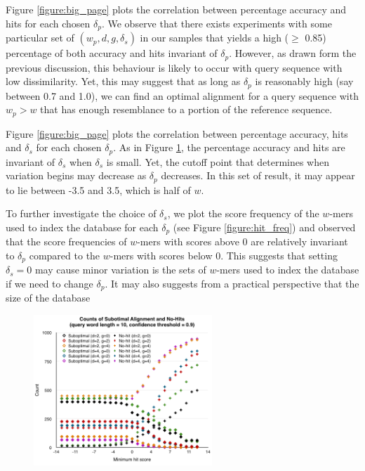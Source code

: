 \documentclass{article}
\begin{document}
Figure \ref{figure:big_page} plots the correlation between percentage accuracy and hits for each chosen $\delta_p$. We observe that there exists experiments with some particular set of $(w_p, d, g, \delta_s)$ in our samples that yields a high ($\ge$ 0.85) percentage of both accuracy and hits invariant of $\delta_p$. However, as drawn form the previous discussion, this behaviour is likely to occur with query sequence with low dissimilarity. Yet, this may suggest that as long as $\delta_p$ is reasonably high (say between 0.7 and 1.0), we can find an optimal alignment for a query sequence with $w_p > w$ that has enough resemblance to a portion of the reference sequence.

Figure \ref{figure:big_page} plots the correlation between percentage accuracy, hits and $\delta_s$ for each chosen $\delta_p$. As in Figure \ref{figure:counts_10}, the percentage accuracy and hits are invariant of $\delta_s$ when $\delta_s$ is small. Yet, the cutoff point that determines when variation begins may decrease as $\delta_p$ decreases. In this set of result, it may appear to lie between -3.5 and 3.5, which is half of $w$. 

To further investigate the choice of $\delta_s$, we plot the score frequency of the $w$-mers used to index the database for each $\delta_p$ (see Figure \ref{figure:hit_freq}) and observed that the score frequencies of $w$-mers with scores above 0 are relatively invariant to $\delta_p$ compared to the $w$-mers with scores below 0. This suggests that setting $\delta_s = 0$ may cause minor variation is the sets of $w$-mers used to index the database if we need to change $\delta_p$. It may also suggests from a practical perspective that the size of the database 

\begin{figure}[tbp]
\begin{center}
\caption{}
  \includegraphics[width=0.60\textwidth]{counts-10}
  \label{figure:counts_10}
\end{center}
\end{figure}
\end{document}
